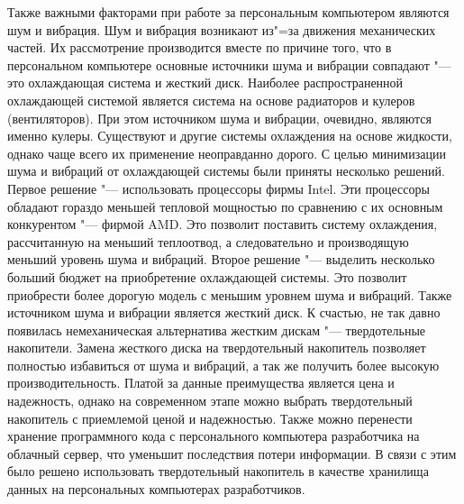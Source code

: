 Также важными факторами при работе за персональным компьютером являются шум и вибрация.
Шум и вибрация возникают из"=за движения механических частей.
Их рассмотрение производится вместе по причине того, что в персональном компьютере основные источники шума и вибрации совпадают "--- это охлаждающая система и жесткий диск.
Наиболее распространенной охлаждающей системой является система на основе радиаторов и кулеров (вентиляторов).
При этом источником шума и вибрации, очевидно, являются именно кулеры.
Существуют и другие системы охлаждения на основе жидкости, однако чаще всего их применение неоправданно дорого.
С целью минимизации шума и вибраций от охлаждающей системы были приняты несколько решений.
Первое решение "--- использовать процессоры фирмы Intel. Эти процессоры обладают гораздо меньшей тепловой мощностью по сравнению с их основным конкурентом "--- фирмой AMD.
Это позволит поставить систему охлаждения, рассчитанную на меньший теплоотвод, а следовательно и производящую меньший уровень шума и вибраций.
Второе решение "--- выделить несколько больший бюджет на приобретение охлаждающей системы. Это позволит приобрести более дорогую модель с меньшим уровнем шума и вибраций.
Также источником шума и вибрации является жесткий диск.
К счастью, не так давно появилась немеханическая альтернатива жестким дискам "--- твердотельные накопители.
Замена жесткого диска на твердотельный накопитель позволяет полностью избавиться от шума и вибраций, а так же получить более высокую производительность.
Платой за данные преимущества является цена и надежность, однако на современном этапе можно выбрать твердотельный накопитель с приемлемой ценой и надежностью.
Также можно перенести хранение программного кода с персонального компьютера разработчика на облачный сервер, что уменьшит последствия потери информации.
В связи с этим было решено использовать твердотельный накопитель в качестве хранилища данных на персональных компьютерах разработчиков.

